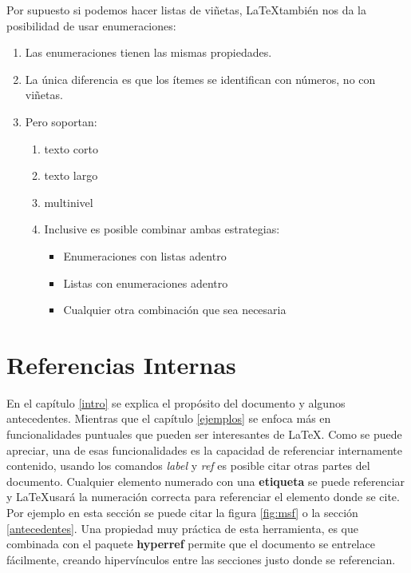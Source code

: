 \documentclass{report}
\begin{document}
Por supuesto si podemos hacer listas de viñetas, \LaTeX también nos da la posibilidad de usar enumeraciones:

\begin{enumerate}
    \item Las enumeraciones tienen las mismas propiedades.
    \item La única diferencia es que los ítemes se identifican con números, no con viñetas.
    \item Pero soportan:
    \begin{enumerate}
        \item texto corto
        \item texto largo
        \item multinivel
        \item Inclusive es posible combinar ambas estrategias:
        \begin{itemize}
            \item Enumeraciones con listas adentro
            \item Listas con enumeraciones adentro
            \item Cualquier otra combinación que sea necesaria
            
        \end{itemize}
    \end{enumerate}
\end{enumerate}

\section{Referencias Internas}\label{referencias}
En el capítulo \ref{intro} se explica el propósito del documento y algunos antecedentes. Mientras que el capítulo \ref{ejemplos} se enfoca más en funcionalidades puntuales que pueden ser interesantes de \LaTeX. Como se puede apreciar, una de esas funcionalidades es la capacidad de referenciar internamente contenido, usando los comandos \textit{label} y \textit{ref} es posible citar otras partes del documento. Cualquier elemento numerado con una \textbf{etiqueta} se puede referenciar y \LaTeX usará la numeración correcta para referenciar el elemento donde se cite. Por ejemplo en esta sección se puede citar la figura \ref{fig:msf} o la sección \ref{antecedentes}. Una propiedad muy práctica de esta herramienta, es que combinada con el paquete \textbf{hyperref} permite que el documento se entrelace fácilmente, creando hipervínculos entre las secciones justo donde se referencian.
\end{document}
